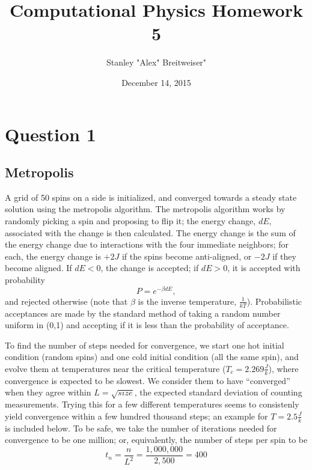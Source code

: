 \documentclass{article}
\title{Computational Physics Homework 5}
\date{December 14, 2015}
\author{Stanley "Alex" Breitweiser"}
\begin{document}
\maketitle

\section{Question 1}
\subsection{Metropolis}
A grid of 50 spins on a side is initialized, and converged towards a steady state solution using the metropolis algorithm. The metropolis algorithm works by randomly picking a spin and proposing to flip it; the energy change, $dE$, associated with the change is then calculated. The energy change is the sum of the energy change due to interactions with the four immediate neighbors; for each, the energy change is $+2J$ if the spins become anti-aligned, or $-2J$ if they become aligned. If $dE < 0$, the change is accepted; if $dE > 0$, it is accepted with probability
$$ P = e^{-\beta dE},$$
and rejected otherwise (note that $\beta$ is the inverse temperature, $\frac{1}{kT}$). Probabilistic acceptances are made by the standard method of taking a random number uniform in (0,1) and accepting if it is less than the probability of acceptance.

To find the number of steps needed for convergence, we start one hot initial condition (random spins) and one cold initial condition (all the same spin), and evolve them at temperatures near the critical temperature ($T_c=2.269\frac{J}{k}$), where convergence is expected to be slowest. We consider them to have ``converged'' when they agree within $L = \sqrt{size}$, the expected standard deviation of counting measurements. Trying this for a few different temperatures seems to consistenly yield convergence within a few hundred thousand steps; an example for $T=2.5\frac{J}{k}$ is included below. To be safe, we take the number of iterations needed for convergence to be one million; or, equivalently, the number of steps per spin to be
$$t_n = \frac{n}{L^2} = \frac{1,000,000}{2,500} = 400$$
\end{document}
